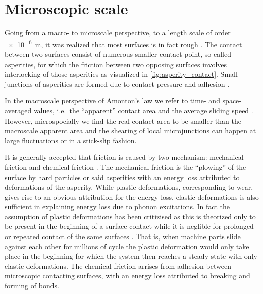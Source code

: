 



\section{Microscopic scale}
Going from a macro- to microscale perspective, to a length scale of order
\SI{e-6}{m}, it was realized that most surfaces is in fact rough
\cite{mo_friction_2009}. The contact between two surfaces consist of numerous
smaller contact point, so-called asperities, for which the friction between two
opposing surfaces involves interlocking of those asperities as visualized in
\cref{fig:asperity_contact}. Small junctions of asperities are formed due
to contact pressure and adhesion \cite{kim_nano-scale_2009}.

In the macroscale perspective of Amonton's law we refer to time- and
space-averaged values, i.e.\ the ``apparent'' contact area and the average
sliding speed \cite{gao_frictional_2004}. However, microspocially we find the
real contact area to be smaller than the macroscale apparent area and the
shearing of local microjunctions can happen at large fluctuations or in a
stick-slip fashion. 

It is generally accepted that friction is caused by two mechanism: mechanical
friction and chemical friction \cite{kim_nano-scale_2009}. The mechanical
friction is the ``plowing'' of the surface by hard particles or said asperities
with an energy loss attributed to deformations of the asperity. While plastic
deformations, corresponding to wear, gives rise to an obvious attribution for
the energy loss, elastic deformations is also sufficient in explaining energy
loss due to phonon excitations. In fact the assumption of plastic deformations
has been critizised as this is theorized only to be present in the beginning of a
surface contact while it is neglible for prolonged or repeated contact of the same surfaces \cite{CARBONE20082555}. That is, when machine parts slide against each
other for millions of cycle the plastic deformation would only take place in the
beginning for which the system then reaches a steady state with only elastic deformations. The chemical friction arrises from adhesion between microscopic
contacting surfaces, with an energy loss attributed to breaking and forming of
bonds. 



